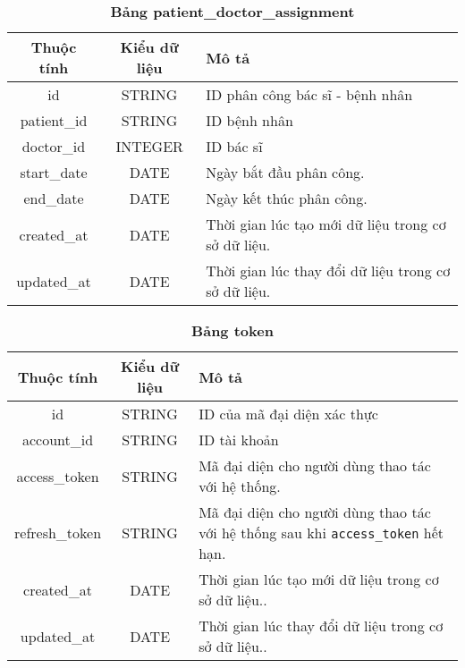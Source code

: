 \begin{table}[H]
  \caption{\bfseries \fontsize{12pt}{0pt}\selectfont Bảng patient\_doctor\_assignment}
  \centering
  \begin{tabularx}{\textwidth}{|c|c|X|}
    \hline
    \textbf{Thuộc tính} & \textbf{Kiểu dữ liệu} & \textbf{Mô tả} \\
    \hline
    id & STRING & ID phân công bác sĩ - bệnh nhân  \\
    \hline
    patient\_id & STRING & ID bệnh nhân  \\
    \hline
    doctor\_id & INTEGER & ID bác sĩ  \\
    \hline
    start\_date & DATE & Ngày bắt đầu phân công. \\
    \hline
    end\_date & DATE & Ngày kết thúc phân công. \\
    \hline
    created\_at & DATE & Thời gian lúc tạo mới dữ liệu trong cơ sở dữ liệu. \\
    \hline
    updated\_at & DATE & Thời gian lúc thay đổi dữ liệu trong cơ sở dữ liệu. \\
    \hline
  \end{tabularx}
\end{table}

\begin{table}[H]
  \caption{\bfseries \fontsize{12pt}{0pt}\selectfont Bảng token}
  \centering
  \begin{tabularx}{\textwidth}{|c|c|X|}
    \hline
    \textbf{Thuộc tính} & \textbf{Kiểu dữ liệu} & \textbf{Mô tả} \\
    \hline
    id & STRING & ID của mã đại diện xác thực  \\
    \hline
    account\_id & STRING & ID tài khoản  \\
    \hline
    access\_token & STRING & Mã đại diện cho người dùng thao tác với hệ thống. \\
    \hline
    refresh\_token & STRING & Mã đại diện cho người dùng thao tác với hệ thống sau khi \texttt{access\_token} hết hạn. \\
    \hline
    created\_at & DATE & Thời gian lúc tạo mới dữ liệu trong cơ sở dữ liệu.. \\
    \hline
    updated\_at & DATE & Thời gian lúc thay đổi dữ liệu trong cơ sở dữ liệu.. \\
    \hline
  \end{tabularx}
\end{table}





